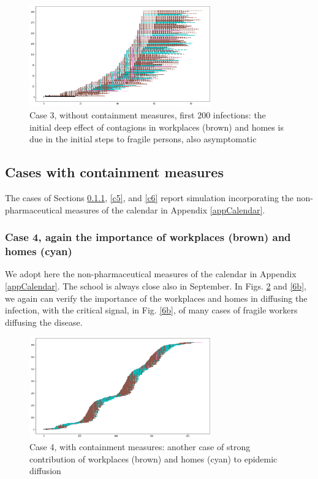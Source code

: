 \documentclass[11pt]{article}
\begin{document}
\begin{figure}[H]
\begin{center}
\includegraphics[width=0.7\textwidth]{no5b.png}%
\caption{Case 3, without containment measures, first 200 infections: the initial deep effect of contagions in workplaces (brown) and homes is due in the initial steps to fragile persons, also asymptomatic}
\label{5b}
\end{center}
\end{figure}

\subsection{Cases with containment measures}

The cases of Sections \ref{c4}, \ref{c5}, and \ref {c6} report simulation incorporating the non-pharmaceutical measures of the calendar in Appendix \ref{appCalendar}.

\subsubsection{Case 4, again the importance of workplaces (brown) and homes (cyan)}
\label{c4}

We adopt here the non-pharmaceutical measures of the calendar in Appendix \ref{appCalendar}. The school is always close also in September. 
In Figs. \ref{6a} and \ref{6b}, we again can verify the importance of the workplaces and homes in diffusing the infection, with the critical signal, in Fig. \ref{6b}, of many cases of fragile workers diffusing the disease.


\begin{figure}[H]
\begin{center}
\includegraphics[width=0.7\textwidth]{with6a.png}%
\caption{Case 4, with containment measures: another case of strong contribution of workplaces (brown) and homes (cyan) to epidemic diffusion}
\label{6a}
\end{center}
\end{figure}
\end{document}
